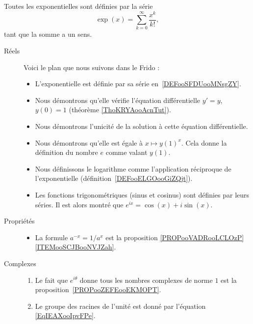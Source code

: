         \label{THEMEooKXSGooCsQNoY}

Toutes les exponentielles sont définies par la série
\begin{equation*}
    \exp(x)=\sum_{k=0}^{\infty}\frac{ x^k }{ k! },
\end{equation*}
tant que la somme a un sens.

\begin{description}
    \item[Réels]

Voici le plan que nous suivons dans le Frido :
\begin{itemize}
    \item L'exponentielle est définie par sa série en~\ref{DEFooSFDUooMNsgZY}.
    \item Nous démontrons qu'elle vérifie l'équation différentielle \( y'=y\), \( y(0)=1\) (théorème \ref{ThoKRYAooAcnTut}).
    \item Nous démontrons l'unicité de la solution à cette équation différentielle.
    \item Nous démontrons qu'elle est égale à \( x\mapsto y(1)^x\). Cela donne la définition du nombre \( e\) comme valant \( y(1)\).
    \item Nous définissons le logarithme comme l'application réciproque de l'exponentielle (définition~\ref{DEFooELGOooGiZQjt}).
    \item Les fonctions trigonométriques (sinus et cosinus) sont définies par leurs séries. Il est alors montré que \(  e^{ix}=\cos(x)+i\sin(x)\).
\end{itemize}

    \item[Propriétés]
        \begin{itemize}
            \item 
        La formule \( a^{-x}=1/a^x\) est la proposition \ref{PROPooVADRooLCLOzP}\ref{ITEMooSCJBooNVJZah}.
        \end{itemize}

    \item[Complexes]

        \begin{enumerate}
            \item
                Le fait que \(  e^{i\theta}\) donne tous les nombres complexes de norme \( 1\) est la proposition~\ref{PROPooZEFEooEKMOPT}.
            \item
                Le groupe des racines de l'unité est donné par l'équation \eqref{EqIEAXooIpvFPe}.
        \end{enumerate}


\end{description}
